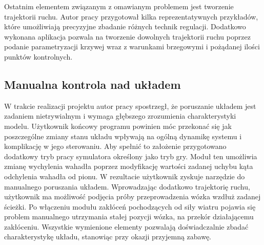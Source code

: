 \documentclass[12pt, oneside]{report}
\theoremstyle{definition}
\begin{document}
Ostatnim elementem związanym z omawianym problemem jest tworzenie trajektorii ruchu. Autor pracy przygotował kilka reprezentatywnych przykładów, które umożliwiają precyzyjne zbadanie różnych technik regulacji. Dodatkowo wykonana aplikacja pozwala na tworzenie dowolnych trajektorii ruchu poprzez podanie parametryzacji krzywej wraz z warunkami brzegowymi i pożądanej ilości punktów kontrolnych.

\subsection{Manualna kontrola nad układem}
W trakcie realizacji projektu autor pracy spostrzegł, że poruszanie układem jest zadaniem nietrywialnym i wymaga głębszego zrozumienia charakterystyki modelu. Użytkownik końcowy programu powinien móc przekonać się jak poszczególne zmiany stanu układu wpływają na ogólną dynamikę systemu i komplikację w jego sterowaniu. Aby spełnić to założenie przygotowano dodatkowy tryb pracy symulatora określony jako tryb gry. Moduł ten umożliwia zmianę wychylenia wahadła poprzez modyfikację wartości zadanej uchybu kąta odchylenia wahadła od pionu. W rezultacie użytkownik zyskuje narzędzie do manualnego poruszania układem. Wprowadzając dodatkowo trajektorię ruchu, użytkownik ma możliwość podjęcia próby przeprowadzenia wózka wzdłuż zadanej ścieżki. Po włączeniu modułu zakłóceń pochodzących od siły wiatru pojawia się problem manualnego utrzymania stałej pozycji wózka, na przekór działającemu zakłóceniu. Wszystkie wymienione elementy pozwalają doświadczalnie zbadać charakterystykę układu, stanowiąc przy okazji przyjemną zabawę.
\end{document}
